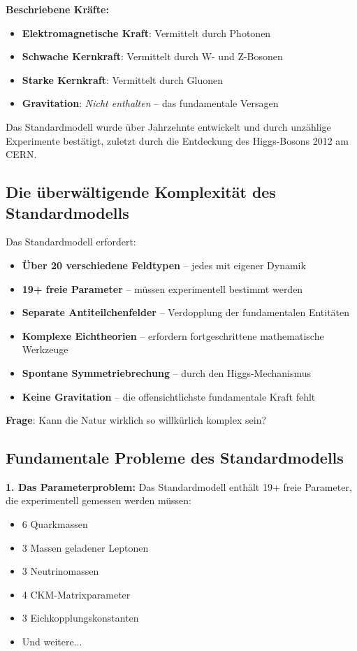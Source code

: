 	\textbf{Beschriebene Kräfte:}
	\begin{itemize}
		\item \textbf{Elektromagnetische Kraft}: Vermittelt durch Photonen
		\item \textbf{Schwache Kernkraft}: Vermittelt durch W- und Z-Bosonen
		\item \textbf{Starke Kernkraft}: Vermittelt durch Gluonen
		\item \textbf{Gravitation}: \emph{Nicht enthalten} -- das fundamentale Versagen
	\end{itemize}
	
	Das Standardmodell wurde über Jahrzehnte entwickelt und durch unzählige Experimente bestätigt, zuletzt durch die Entdeckung des Higgs-Bosons 2012 am CERN.
	
	\subsection{Die überwältigende Komplexität des Standardmodells}
	
	\begin{tcolorbox}[colback=red!5!white,colframe=red!75!black,title=Standardmodell-Komplexitätskrise]
		Das Standardmodell erfordert:
		\begin{itemize}
			\item \textbf{Über 20 verschiedene Feldtypen} -- jedes mit eigener Dynamik
			\item \textbf{19+ freie Parameter} -- müssen experimentell bestimmt werden
			\item \textbf{Separate Antiteilchenfelder} -- Verdopplung der fundamentalen Entitäten
			\item \textbf{Komplexe Eichtheorien} -- erfordern fortgeschrittene mathematische Werkzeuge
			\item \textbf{Spontane Symmetriebrechung} -- durch den Higgs-Mechanismus
			\item \textbf{Keine Gravitation} -- die offensichtlichste fundamentale Kraft fehlt
		\end{itemize}
		
		\textbf{Frage}: Kann die Natur wirklich so willkürlich komplex sein?
	\end{tcolorbox}
	
	\subsection{Fundamentale Probleme des Standardmodells}
	
	\textbf{1. Das Parameterproblem:}
	Das Standardmodell enthält 19+ freie Parameter, die experimentell gemessen werden müssen:
	\begin{itemize}
		\item 6 Quarkmassen
		\item 3 Massen geladener Leptonen  
		\item 3 Neutrinomassen
		\item 4 CKM-Matrixparameter
		\item 3 Eichkopplungskonstanten
		\item Und weitere...
	\end{itemize}
	
